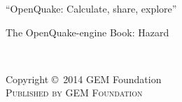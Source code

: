 \documentclass[11pt,fleqn]{book} %
\begin{document}



\begingroup
\thispagestyle{empty}
\par\normalfont\fontsize{15}{15}\sffamily\selectfont
“OpenQuake: Calculate, share, explore”
\centering
\vspace*{9cm}
\par\normalfont\fontsize{35}{35}\sffamily\selectfont
The OpenQuake-engine Book: Hazard\par %
\endgroup


\newpage
~\vfill
\thispagestyle{empty}

\noindent Copyright \copyright\ 2014 GEM Foundation\\ %

\noindent \textsc{Published by GEM Foundation}\\ %
\end{document}
